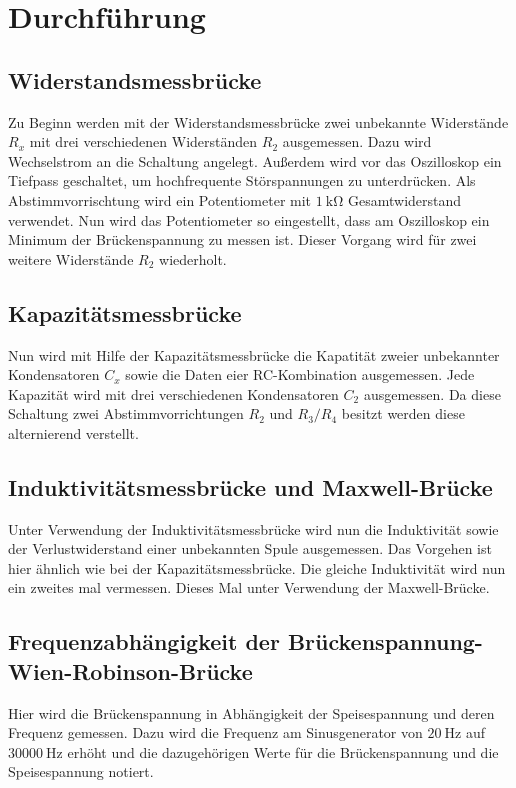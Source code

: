 \section{Durchführung}
\subsection{Widerstandsmessbrücke}
Zu Beginn werden mit der Widerstandsmessbrücke zwei unbekannte Widerstände $R_{x}$ mit
drei verschiedenen Widerständen $R_{2}$ ausgemessen.
Dazu wird Wechselstrom an die Schaltung angelegt. Außerdem wird vor das Oszilloskop
ein Tiefpass geschaltet, um hochfrequente Störspannungen zu unterdrücken.
Als Abstimmvorrischtung wird ein Potentiometer mit $\SI{1}{\kilo\ohm}$ Gesamtwiderstand
verwendet. Nun wird das Potentiometer so eingestellt, dass am Oszilloskop
ein Minimum der Brückenspannung zu messen ist. Dieser Vorgang wird für zwei weitere
Widerstände $R_{2}$ wiederholt.

\subsection{Kapazitätsmessbrücke}
Nun wird mit Hilfe der Kapazitätsmessbrücke die Kapatität zweier unbekannter
Kondensatoren $C_{x}$ sowie die Daten eier RC-Kombination ausgemessen. Jede Kapazität
wird mit drei verschiedenen Kondensatoren $C_{2}$ ausgemessen.
\noindent Da diese Schaltung zwei Abstimmvorrichtungen $R_{2}$ und $R_{3}/R_{4}$ besitzt werden diese
alternierend verstellt.

\subsection{Induktivitätsmessbrücke und Maxwell-Brücke}
\noindent Unter Verwendung der Induktivitätsmessbrücke wird nun die Induktivität sowie
der Verlustwiderstand einer unbekannten Spule ausgemessen. Das Vorgehen ist hier
ähnlich wie bei der Kapazitätsmessbrücke.
Die gleiche Induktivität wird nun ein zweites mal vermessen. Dieses Mal unter
Verwendung der Maxwell-Brücke.

\subsection{Frequenzabhängigkeit der Brückenspannung-Wien-Robinson-Brücke}
\noindent Hier wird die Brückenspannung in Abhängigkeit der Speisespannung und deren Frequenz gemessen.
Dazu wird die Frequenz am Sinusgenerator von $\SI{20}{\hertz}$ auf $\SI{30000}{\hertz}$ erhöht und
die dazugehörigen Werte für die Brückenspannung und die Speisespannung notiert.





\label{sec:Durchführung}
